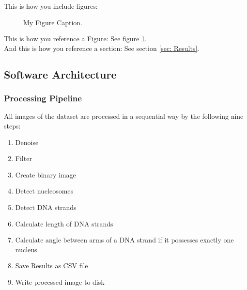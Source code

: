 \documentclass{article}
\begin{document}
\newpage
























\newpage

This is how you include figures:
\begin{figure}[htb]
	\begin{center}
	\end{center}
	\caption{My Figure Caption.}
	\label{fig: example} %
\end{figure}

This is how you reference a Figure: See figure \ref{fig: example}. \\
And this is how you reference a section: See section \ref{sec: Results}.


\subsection{Software Architecture}


\subsubsection{Processing Pipeline}
All images of the dataset are processed in a sequential way by the following nine steps:

\begin{enumerate}
	\item Denoise
	\item Filter
	\item Create binary image
	\item Detect nucleosomes %
	\item Detect DNA strands 
	\item Calculate length of DNA strands
	\item Calculate angle between arms of a DNA strand if it possesses exactly one nucleus
	\item Save Results as CSV file
	\item Write processed image to disk
	
\end{enumerate}
\end{document}
